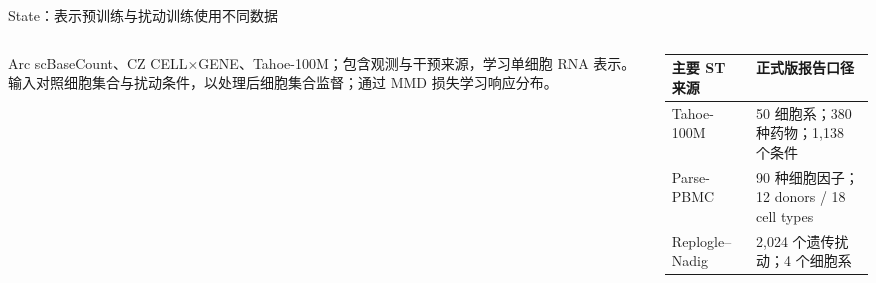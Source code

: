 \begin{frame}[t]{State：表示预训练与扰动训练使用不同数据}
\bodyfont
\begin{columns}[T,onlytextwidth]
\begin{column}{.47\textwidth}
Arc scBaseCount、CZ CELL$\times$GENE、Tahoe-100M；包含观测与干预来源，学习单细胞 RNA 表示。
\vspace{.40cm}
输入对照细胞集合与扰动条件，以处理后细胞集合监督；通过 MMD 损失学习响应分布。
\end{column}
\begin{column}{.50\textwidth}
\renewcommand{\arraystretch}{1.20}
\begin{tabularx}{\linewidth}{@{}P{2.15cm}Y@{}}
\toprule\textbf{主要 ST 来源}&\textbf{正式版报告口径}\\\midrule
Tahoe-100M & 50 细胞系；380 种药物；1,138 个条件\\
Parse-PBMC & 90 种细胞因子；12 donors / 18 cell types\\
Replogle--Nadig & 2,024 个遗传扰动；4 个细胞系\\\bottomrule
\end{tabularx}
\end{column}
\end{columns}
\vspace{.16cm}
\end{frame}
